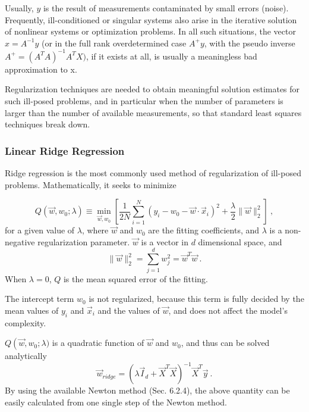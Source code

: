 Usually, $y$ is the result of measurements contaminated by small errors
(noise). Frequently, ill-conditioned or singular systems also arise in the iterative solution of nonlinear systems or optimization problems. In all such situations, the vector $x = {A}^{-1}y$ (or in the full rank overdetermined
case $A^+ y$, with the pseudo inverse $A^+ = (A^T A)^{−1}A^T X)$, if it exists at all, is usually a meaningless bad approximation to x.

Regularization techniques are needed to obtain meaningful solution estimates 
for such ill-posed problems, and in particular when the number of parameters 
is larger than the number of available measurements, so that standard least 
squares techniques break down.

\subsubsection{Linear Ridge Regression}
Ridge regression is the most commonly used method of regularization of
ill-posed problems. Mathematically, it seeks to minimize

\begin{equation}
Q\left(\vec{w},w_0;\lambda\right)\equiv \min_{\vec{w},w_0}\left[ \frac{1}{2N} \sum_{i=1}^{N} \left( y_i - w_0 -
    \vec{w} \cdot \vec{x}_i \right)^2
  +\frac{\lambda}{2}\|\vec{w}\|_2^2 \right]\ ,
\end{equation}
for a given value of $\lambda$, where $\vec{w}$ and $w_0$ are the fitting coefficients, and $\lambda$
is a non-negative regularization parameter. $\vec{w}$ is a vector in
$d$ dimensional space, and
\begin{equation}
\|\vec{w}\|_2^2 = \sum_{j=1}^{d}w_j^2 = \vec{w}^T\vec{w}\ .
\end{equation}
When $\lambda = 0$, $Q$ is
the mean squared error of the fitting.

The intercept term $w_0$ is not regularized, because this term is
fully decided by the mean values of $y_i$ and $\vec{x}_i$ and the
values of $\vec{w}$, and does not affect the model's complexity.

$Q\left(\vec{w},w_0;\lambda)$ is a quadratic function of $\vec{w}$ and
  $w_0$, and thus can be solved analytically
\begin{equation}
\vec{w}_{ridge}=\left(\lambda\vec{I}_d +
  \vec{X}^T\vec{X}\right)^{-1}\vec{X}^T\vec{y}\ .
\end{equation}
By using the available Newton method (Sec. 6.2.4), the above quantity can be easily
calculated from one single step of the Newton method.

